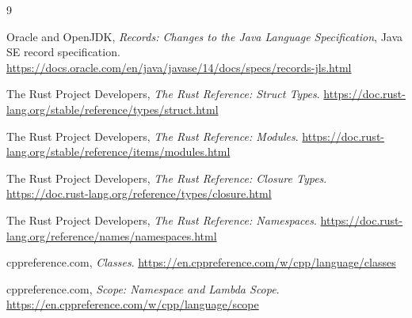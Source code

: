 \documentclass[11pt]{article}
\begin{document}
\begin{thebibliography}{9}

Oracle and OpenJDK,
\textit{Records: Changes to the Java Language Specification},
Java SE record specification.
\url{https://docs.oracle.com/en/java/javase/14/docs/specs/records-jls.html}

The Rust Project Developers,
\textit{The Rust Reference: Struct Types}.
\url{https://doc.rust-lang.org/stable/reference/types/struct.html}

The Rust Project Developers,
\textit{The Rust Reference: Modules}.
\url{https://doc.rust-lang.org/stable/reference/items/modules.html}

The Rust Project Developers,
\textit{The Rust Reference: Closure Types}.
\url{https://doc.rust-lang.org/reference/types/closure.html}

The Rust Project Developers,
\textit{The Rust Reference: Namespaces}.
\url{https://doc.rust-lang.org/reference/names/namespaces.html}

cppreference.com,
\textit{Classes}.
\url{https://en.cppreference.com/w/cpp/language/classes}

cppreference.com,
\textit{Scope: Namespace and Lambda Scope}.
\url{https://en.cppreference.com/w/cpp/language/scope}

\end{thebibliography}
\end{document}
